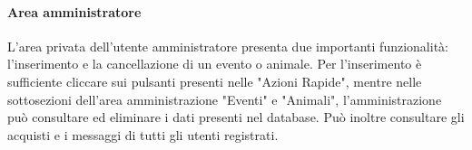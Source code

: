             \paragraph{Area amministratore} L'area privata dell'utente amministratore presenta due importanti funzionalità: l'inserimento e la cancellazione di un evento o animale. Per l'inserimento è sufficiente cliccare sui pulsanti presenti nelle "Azioni Rapide", mentre nelle sottosezioni dell'area amministrazione "Eventi" e "Animali", l'amministrazione può consultare ed eliminare i dati presenti nel database. Può inoltre consultare gli acquisti e i messaggi di tutti gli utenti registrati.

\pagebreak
